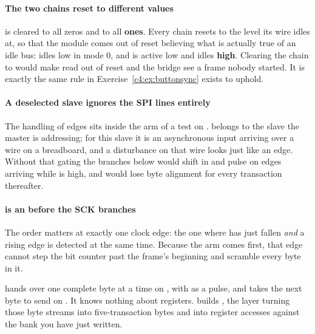 \paragraph{The two chains reset to different values}
 is cleared to all zeros and  to all \textbf{ones}. Every chain resets to the
level its wire idles at, so that the module comes out of reset believing what is actually true of an
idle bus:  idles low in mode 0, and  is active low and idles \textbf{high}.
Clearing the  chain to  would make  read  out of reset
and the bridge see a frame nobody started. It is exactly the same rule  in
Exercise~\ref{c4:ex:buttonsync} exists to uphold.

\paragraph{A deselected slave ignores the SPI lines entirely}
The handling of  edges sits inside the  arm of a test on .
 belongs to the slave the master is addressing; for this slave it is an asynchronous input
arriving over a wire on a breadboard, and a disturbance on that wire looks just like an edge. Without
that gating the branches below would shift in  and pulse  on edges arriving
while  is high, and  would lose byte alignment for every transaction
thereafter.

\paragraph{ is an  before the SCK branches}
The order matters at exactly one clock edge: the one where  has just fallen \emph{and} a
rising  edge is detected at the same time. Because the  arm comes first,
that  edge cannot step the bit counter past the frame's beginning and scramble every byte in
it.

 hands over one complete byte at a time on , with  as a
pulse, and takes the next byte to send on . It knows nothing about registers.
 builds , the layer turning those byte streams into
five-transaction bytes and into register accesses against the bank you have just written.
